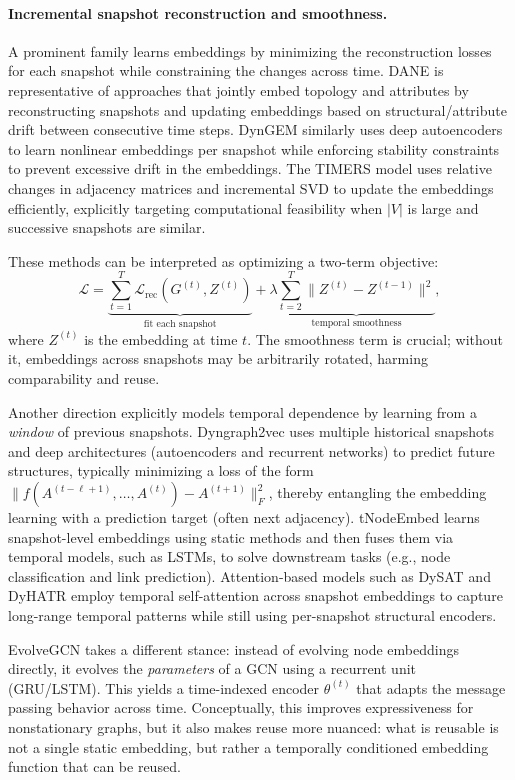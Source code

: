 \paragraph{Incremental snapshot reconstruction and smoothness.}
A prominent family learns embeddings by minimizing the reconstruction losses for each snapshot while constraining the changes across time. DANE \cite{li2017dane} is representative of approaches that jointly embed topology and attributes by reconstructing snapshots and updating embeddings based on structural/attribute drift between consecutive time steps. DynGEM \cite{goyal2018dyngem}  similarly uses deep autoencoders to learn nonlinear embeddings per snapshot while enforcing stability constraints to prevent excessive drift in the embeddings. The TIMERS \cite{zhang2018timers} model uses relative changes in adjacency matrices and incremental SVD to update the embeddings efficiently, explicitly targeting computational feasibility when $|V|$ is large and successive snapshots are similar.

These methods can be interpreted as optimizing a two-term objective:
\[
\mathcal{L} = \underbrace{\sum_{t=1}^{T} \mathcal{L}_{\text{rec}}(G^{(t)}, Z^{(t)})}_{\text{fit each snapshot}}
+ \lambda \underbrace{\sum_{t=2}^{T}\|Z^{(t)}-Z^{(t-1)}\|^2}_{\text{temporal smoothness}},
\]
where $Z^{(t)}$ is the embedding at time $t$. The smoothness term is crucial; without it, embeddings across snapshots may be arbitrarily rotated, harming comparability and reuse.

Another direction explicitly models temporal dependence by learning from a \emph{window} of previous snapshots. Dyngraph2vec \cite{goyal2019dyngraph2vec} uses multiple historical snapshots and deep architectures (autoencoders and recurrent networks) to predict future structures, typically minimizing a loss of the form $\|f(A^{(t-\ell+1)},\ldots,A^{(t)})-A^{(t+1)}\|_F^2$, thereby entangling the embedding learning with a prediction target (often next adjacency). tNodeEmbed \cite{singer2019tnodeembed} learns snapshot-level embeddings using static methods and then fuses them via temporal models, such as LSTMs, to solve downstream tasks (e.g., node classification and link prediction). Attention-based models such as DySAT \cite{sankar2020dysat} and DyHATR \cite{xue2020dyhatr} employ temporal self-attention across snapshot embeddings to capture long-range temporal patterns while still using per-snapshot structural encoders.

EvolveGCN takes a different stance: instead of evolving node embeddings directly, it evolves the \emph{parameters} of a GCN using a recurrent unit (GRU/LSTM). This yields a time-indexed encoder $\theta^{(t)}$ that adapts the message passing behavior across time. Conceptually, this improves expressiveness for nonstationary graphs, but it also makes reuse more nuanced: what is reusable is not a single static embedding, but rather a temporally conditioned embedding function that can be reused.

